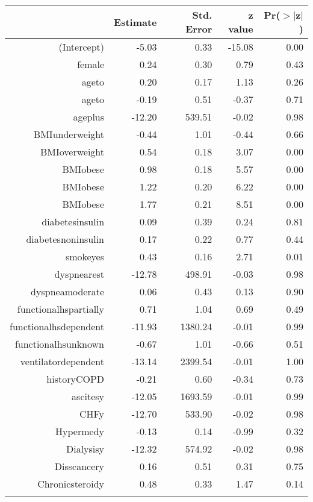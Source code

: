 \bigskip\bigskip
\centering
\begin{tabular}{rrrrr}
  \hline
 & Estimate & Std. Error & z value & Pr($>$$|$z$|$) \\ 
  \hline
(Intercept) & -5.03 & 0.33 & -15.08 & 0.00 \\ 
  female & 0.24 & 0.30 & 0.79 & 0.43 \\ 
  age\-65\-to\-74 & 0.20 & 0.17 & 1.13 & 0.26 \\ 
  age\-75\-to\-84 & -0.19 & 0.51 & -0.37 & 0.71 \\ 
  age\-85\-plus & -12.20 & 539.51 & -0.02 & 0.98 \\ 
  BMI\-underweight & -0.44 & 1.01 & -0.44 & 0.66 \\ 
  BMI\-overweight & 0.54 & 0.18 & 3.07 & 0.00 \\ 
  BMI\-obese\-1 & 0.98 & 0.18 & 5.57 & 0.00 \\ 
  BMI\-obese\-2 & 1.22 & 0.20 & 6.22 & 0.00 \\ 
  BMI\-obese\-3 & 1.77 & 0.21 & 8.51 & 0.00 \\ 
  diabetes\-insulin & 0.09 & 0.39 & 0.24 & 0.81 \\ 
  diabetes\-noninsulin & 0.17 & 0.22 & 0.77 & 0.44 \\ 
  smoke\-yes & 0.43 & 0.16 & 2.71 & 0.01 \\ 
  dyspnea\-rest & -12.78 & 498.91 & -0.03 & 0.98 \\ 
  dyspnea\-moderate & 0.06 & 0.43 & 0.13 & 0.90 \\ 
  functional\-hs\-partially & 0.71 & 1.04 & 0.69 & 0.49 \\ 
  functional\-hs\-dependent & -11.93 & 1380.24 & -0.01 & 0.99 \\ 
  functional\-hs\-unknown & -0.67 & 1.01 & -0.66 & 0.51 \\ 
  ventilator\-dependent & -13.14 & 2399.54 & -0.01 & 1.00 \\ 
  history\-COPD & -0.21 & 0.60 & -0.34 & 0.73 \\ 
  ascites\-y & -12.05 & 1693.59 & -0.01 & 0.99 \\ 
  CHF\-y & -12.70 & 533.90 & -0.02 & 0.98 \\ 
  Hyper\-med\-y & -0.13 & 0.14 & -0.99 & 0.32 \\ 
  Dialysis\-y & -12.32 & 574.92 & -0.02 & 0.98 \\ 
  Diss\-cancer\-y & 0.16 & 0.51 & 0.31 & 0.75 \\ 
  Chronic\-steroid\-y & 0.48 & 0.33 & 1.47 & 0.14 \\ 
$$
\end{tabular}
